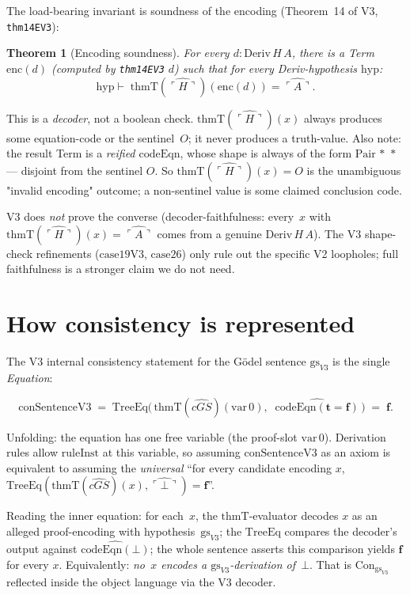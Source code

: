 \documentclass[11pt]{article}
\newtheorem{theorem}{Theorem}
\newcommand{\trueT}{\mathbf{t}}
\newcommand{\falseT}{\mathbf{f}}
\newcommand{\code}[1]{\ulcorner #1 \urcorner}
\newcommand{\reify}[1]{\widehat{#1}}
\newcommand{\thmT}{\mathrm{thmT}}
\newcommand{\TreeEq}{\mathrm{TreeEq}}
\begin{document}
The load-bearing invariant is soundness of the encoding (Theorem~14
of V3, \texttt{thm14EV3}):

\begin{theorem}[Encoding soundness]
For every $d : \mathrm{Deriv}\,H\,A$, there is a Term $\mathrm{enc}(d)$
(computed by \texttt{thm14EV3} $d$) such that for every Deriv-hypothesis
$\mathrm{hyp}$:
\[
  \mathrm{hyp} \vdash
   \;\thmT(\reify{\code{H}})(\mathrm{enc}(d)) = \reify{\code{A}}.
\]
\end{theorem}

This is a \emph{decoder}, not a boolean check.  $\thmT(\reify{\code{H}})(x)$
always produces some equation-code or the sentinel~$O$; it never
produces a truth-value.  Also note: the result Term is a
\emph{reified $\mathrm{codeEqn}$}, whose shape is always of the form
$\mathrm{Pair}\,*\,*$ --- disjoint from the sentinel $O$.  So
$\thmT(\reify{\code{H}})(x) = O$ is the unambiguous "invalid encoding"
outcome; a non-sentinel value is some claimed conclusion code.

V3 does \emph{not} prove the converse (decoder-faithfulness: every~$x$
with $\thmT(\reify{\code{H}})(x) = \reify{\code{A}}$ comes from a
genuine $\mathrm{Deriv}\,H\,A$).  The V3 shape-check refinements
($\mathrm{case19V3}$, $\mathrm{case26}$) only rule out the specific
V2 loopholes; full faithfulness is a stronger claim we do not need.

\section{How consistency is represented}

The V3 internal consistency statement for the G\"odel sentence
$\mathrm{gs}_{V3}$ is the single \emph{Equation}:

\[
  \mathrm{conSentenceV3} \;=\;
  \TreeEq\bigl(\,\thmT(\reify{cGS})(\mathrm{var}\,0),\;\;
                \reify{\mathrm{codeEqn}(\trueT = \falseT)}\,\bigr)
  \;=\; \falseT.
\]

Unfolding: the equation has one free variable (the proof-slot
$\mathrm{var}\,0$).  Derivation rules allow $\mathrm{ruleInst}$ at
this variable, so assuming $\mathrm{conSentenceV3}$ as an axiom is
equivalent to assuming the \emph{universal}
``for every candidate encoding $x$,
$\TreeEq(\thmT(\reify{cGS})(x), \reify{\code{\bot}}) = \falseT$''.

Reading the inner equation: for each~$x$, the $\thmT$-evaluator
decodes $x$ as an alleged proof-encoding with hypothesis~$\mathrm{gs}_{V3}$;
the $\TreeEq$ compares the decoder's output against
$\reify{\mathrm{codeEqn}(\bot)}$; the whole sentence asserts this
comparison yields $\falseT$ for every $x$.  Equivalently: \emph{no~$x$
encodes a $\mathrm{gs}_{V3}$-derivation of~$\bot$}.  That is
$\mathrm{Con}_{\mathrm{gs}_{V3}}$ reflected inside the object language
via the V3 decoder.
\end{document}
